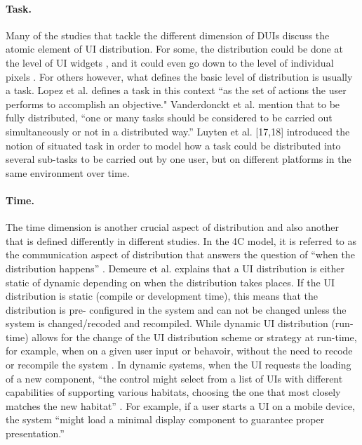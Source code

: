 \paragraph{Task.} Many of the studies that tackle the different dimension of
DUIs discuss the atomic element of UI distribution. For some, the distribution
could be done at the level of UI widgets \cite{vanderdonckt2010distributed}, and
it could even go down to the level of individual pixels \cite{demeure20084c}.
For others however, what defines the basic level of distribution is usually a
task. Lopez et al. \cite{lopez2011formal} defines a task in this context ``as the
set of actions the user performs to accomplish an objective."
Vanderdonckt et al. \cite{vanderdonckt2010distributed} mention that 
to be fully distributed, ``one or many tasks should be considered to be
carried out simultaneously or not in a distributed way.''  Luyten et al. [17,18] introduced the notion of situated task in
order to model how a task could be distributed into several sub-tasks to be
carried out by one user, but on different platforms in the same environment
over time.

\paragraph{Time.} The time dimension is another crucial aspect of distribution
and also another that is defined differently in different studies. In the 4C
model, it is referred to as the communication aspect of distribution that
answers the question of ``when the distribution happens'' \cite{demeure20084c}.
Demeure et al. explains that a UI distribution is either static of dynamic
depending on when the distribution takes places. If the UI distribution is
static (compile or development time), this means that the distribution is pre-
configured in the system and can not be changed unless the system is
changed/recoded and recompiled. While dynamic UI distribution (run-time) allows
for the change of the UI distribution scheme or strategy at run-time, for
example, when on a given user input or behavoir, without the need to recode or
recompile the system \cite{demeure20084c}. In dynamic systems,
when the UI requests the loading of a new component, ``the control might select
from a list of UIs with different capabilities of supporting various habitats,
choosing the one that most closely matches the new habitat'' \cite{demeure20084c}.
For example, if a user starts a UI on a mobile device, the system ``might
load a minimal display component to guarantee proper presentation.'' \cite{demeure20084c}\\

